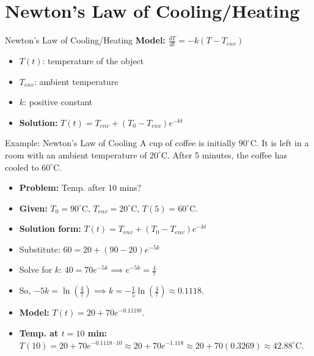 \documentclass[10pt,aspectratio=169]{beamer}
\begin{document}
\section{Newton's Law of Cooling/Heating}
\begin{frame}{Newton's Law of Cooling/Heating}
    \textbf{Model:} $\frac{dT}{dt} = -k(T - T_{env})$
    \begin{itemize}
        \item $T(t)$: temperature of the object
        \item $T_{env}$: ambient temperature
        \item $k$: positive constant
        \item \textbf{Solution:} $T(t) = T_{env} + (T_0 - T_{env})e^{-kt}$
    \end{itemize}
\end{frame}

\begin{frame}{Example: Newton's Law of Cooling}
    A cup of coffee is initially $90^{\circ}\text{C}$. It is left in a room with an ambient temperature of $20^{\circ}\text{C}$. After 5 minutes, the coffee has cooled to $60^{\circ}\text{C}$.
    \begin{itemize}
        \item \textbf{Problem:} Temp. after 10 mins?
        \item \textbf{Given:} $T_0 = 90^{\circ}\text{C}$, $T_{env} = 20^{\circ}\text{C}$, $T(5) = 60^{\circ}\text{C}$.
        \item \textbf{Solution form:} $T(t) = T_{env} + (T_0 - T_{env})e^{-kt}$
        \item Substitute: $60 = 20 + (90 - 20)e^{-5k}$
        \item Solve for $k$: $40 = 70e^{-5k} \implies e^{-5k} = \frac{4}{7}$
        \item So, $-5k = \ln\left(\frac{4}{7}\right) \implies k = -\frac{1}{5}\ln\left(\frac{4}{7}\right) \approx 0.1118$.
        \item \textbf{Model:} $T(t) = 20 + 70e^{-0.1118t}$.
        \item \textbf{Temp. at $t=10$ min:} $T(10) = 20 + 70e^{-0.1118 \cdot 10} \approx 20 + 70e^{-1.118} \approx 20 + 70(0.3269) \approx 42.88^{\circ}\text{C}$.
    \end{itemize}
\end{frame}

\end{document}
